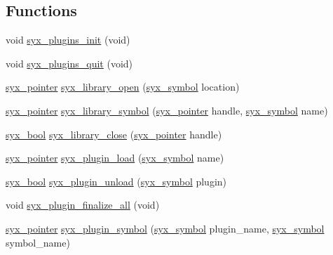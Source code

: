 \subsection*{Functions}
\begin{CompactItemize}
\item 
void \hyperlink{syx-plugins_8c_50f74dbc73f9dd07eed9abdc542f599f}{syx\_\-plugins\_\-init} (void)
\item 
void \hyperlink{syx-plugins_8c_a1d8890400fc665042cabbd6467ad38b}{syx\_\-plugins\_\-quit} (void)
\item 
\hyperlink{syx-types_8h_51c518ab1f082eb4330ca143afb1584f}{syx\_\-pointer} \hyperlink{syx-plugins_8c_85042890723bb68c8c38269b24a452ff}{syx\_\-library\_\-open} (\hyperlink{syx-types_8h_9663af54b7b72f5d8be5f754ef356525}{syx\_\-symbol} location)
\item 
\hyperlink{syx-types_8h_51c518ab1f082eb4330ca143afb1584f}{syx\_\-pointer} \hyperlink{syx-plugins_8c_8657d2487cbbf5b77f3956c3056a4790}{syx\_\-library\_\-symbol} (\hyperlink{syx-types_8h_51c518ab1f082eb4330ca143afb1584f}{syx\_\-pointer} handle, \hyperlink{syx-types_8h_9663af54b7b72f5d8be5f754ef356525}{syx\_\-symbol} name)
\item 
\hyperlink{syx-types_8h_c6dc09b276b99fa1956364359139daab}{syx\_\-bool} \hyperlink{syx-plugins_8c_a5b2684eeb91a217aac36985a65098f3}{syx\_\-library\_\-close} (\hyperlink{syx-types_8h_51c518ab1f082eb4330ca143afb1584f}{syx\_\-pointer} handle)
\item 
\hyperlink{syx-types_8h_51c518ab1f082eb4330ca143afb1584f}{syx\_\-pointer} \hyperlink{syx-plugins_8c_3a83182999fbe72d438b68bcf78d1dcf}{syx\_\-plugin\_\-load} (\hyperlink{syx-types_8h_9663af54b7b72f5d8be5f754ef356525}{syx\_\-symbol} name)
\item 
\hyperlink{syx-types_8h_c6dc09b276b99fa1956364359139daab}{syx\_\-bool} \hyperlink{syx-plugins_8c_93dae14d03f2f02c702c84e3a516b9c9}{syx\_\-plugin\_\-unload} (\hyperlink{syx-types_8h_9663af54b7b72f5d8be5f754ef356525}{syx\_\-symbol} plugin)
\item 
void \hyperlink{syx-plugins_8c_2fdd83073eecb3faae4d70d95d0891e1}{syx\_\-plugin\_\-finalize\_\-all} (void)
\item 
\hyperlink{syx-types_8h_51c518ab1f082eb4330ca143afb1584f}{syx\_\-pointer} \hyperlink{syx-plugins_8c_a502d3b593c9e0feabd2f6575d4326f0}{syx\_\-plugin\_\-symbol} (\hyperlink{syx-types_8h_9663af54b7b72f5d8be5f754ef356525}{syx\_\-symbol} plugin\_\-name, \hyperlink{syx-types_8h_9663af54b7b72f5d8be5f754ef356525}{syx\_\-symbol} symbol\_\-name)
\item 

\end{CompactItemize}
